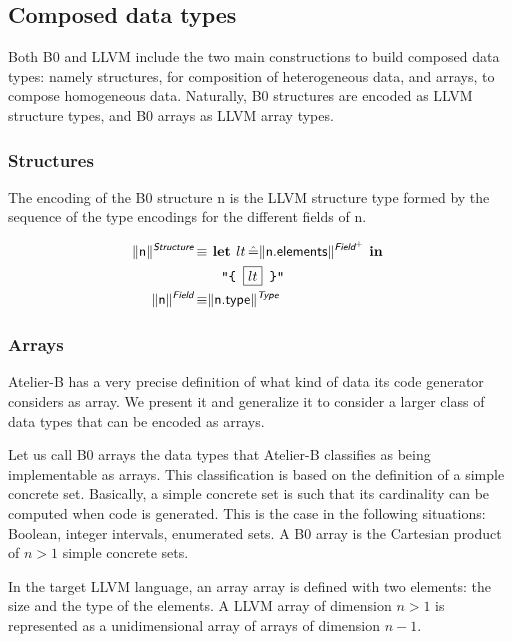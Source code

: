 \documentclass{llncs}
\newcommand{\trad}[2]{\ensuremath{\lVert \textsf{#1} \rVert^{\textit{#2}}}}
\DeclareMathOperator{\isdef}{\equiv}
\newcommand{\llvm}[1]{\texttt{#1}}
\newcommand{\B}[1]{\textsf{#1}}
\newcommand{\ListOf}[1]{$\mbox{#1}^+$}
\newcommand{\LET}[0]{\textbf{ let }}
\DeclareMathOperator{\BE}{\hat{=}}
\newcommand{\IN}[0]{\textbf{ in }}
\newcommand{\PH}[1]{\framebox{$#1$}}
\begin{document}
\subsection{Composed data types}

Both B0 and LLVM include the two main constructions to build composed
data types: namely structures, for composition of heterogeneous data,
and arrays, to compose homogeneous data. Naturally, B0 structures are
encoded as LLVM structure types, and B0 arrays as LLVM array types.

\subsubsection{Structures}

The encoding of the B0 structure \B{n} is the LLVM structure type
formed by the sequence of the type encodings for the different fields
of \B{n}.

\begin{align*}
  \trad{\B{n}}{\B{Structure}} \isdef
  & \LET lt \BE \trad{\B{n.elements}}{\ListOf{\B{Field}}} \IN\\
  & \quad \llvm{"\{ \PH{lt} \}"} \\
  \trad{\B{n}}{\B{Field}} \isdef
  & \trad{\B{n.type}}{\B{Type}}
\end{align*}

\subsubsection{Arrays}
\label{sec:types:arrays}

Atelier-B has a very precise definition of what kind of data its code
generator considers as array. We present it and generalize it to
consider a larger class of data types that can be encoded as arrays.

Let us call B0 arrays the data types that Atelier-B classifies as
being implementable as arrays. This classification is based on the
definition of a simple concrete set. Basically, a simple concrete set
is such that its cardinality can be computed when code is generated.
This is the case in the following situations: Boolean, integer
intervals, enumerated sets. A B0 array is the Cartesian product of $n
> 1$ simple concrete sets.

In the target LLVM language, an array array is defined with two
elements: the size and the type of the elements. A LLVM array of
dimension $n > 1$ is represented as a unidimensional array of arrays
of dimension $n-1$.
\end{document}
